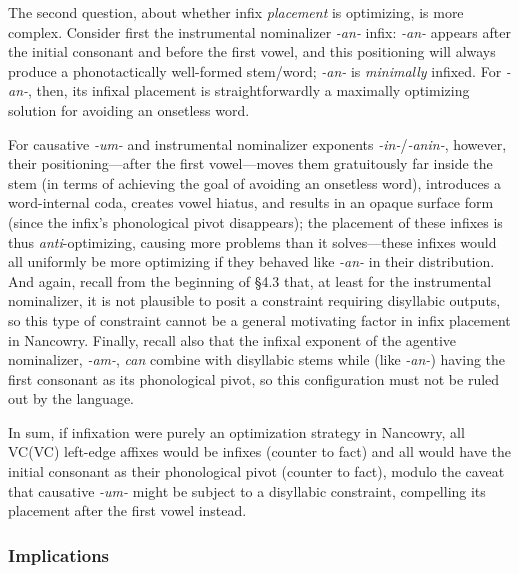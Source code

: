 \documentclass[output=paper,colorlinks,citecolor=brown,
]{langscibook}
\begin{document}
The second question, about whether infix {\it placement} is optimizing, is more complex. Consider first the instrumental nominalizer \textit{-an-} infix: \textit{-an-} appears after the initial consonant and before the first vowel, and this positioning will always produce a phonotactically well-formed stem/word; \textit{-an-} is {\it minimally} infixed. For \textit{-an-}, then, its infixal placement is straightforwardly a maximally optimizing solution for avoiding an onsetless word. 

For causative \textit{-um-} and instrumental nominalizer exponents \textit{-in-}/\textit{-anin-}, however, their positioning---after the first vowel---moves them gratuitously far inside the stem (in terms of achieving the goal of avoiding an onsetless word), introduces a word-internal coda, creates vowel hiatus, and results in an opaque surface form (since the infix's phonological pivot disappears); the placement of these infixes is thus {\it anti}-optimizing, causing more problems than it solves---these infixes would all uniformly be more optimizing if they behaved like \textit{-an-} in their distribution. And again, recall from the beginning of \S4.3 that, at least for the instrumental nominalizer, it is not plausible to posit a constraint requiring disyllabic outputs, so this type of constraint cannot be a general motivating factor in infix placement in Nancowry. Finally, recall also that the infixal exponent of the agentive nominalizer, \textit{-am-}, {\it can} combine with disyllabic stems while (like \textit{-an-}) having the first consonant as its phonological pivot, so this configuration must not be ruled out by the language. 

In sum, if infixation were purely an optimization strategy in Nancowry, all VC(VC) left-edge affixes would be infixes (counter to fact) and all would have the initial consonant as their phonological pivot (counter to fact), modulo the caveat that causative \textit{-um-} might be subject to a disyllabic constraint, compelling its placement after the first vowel instead.


\subsubsection{Implications}
\end{document}
